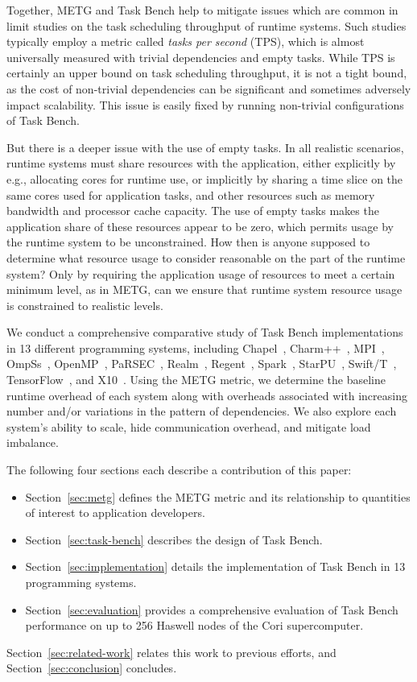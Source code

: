 Together, METG and Task Bench help to mitigate issues which are common
in limit studies on the task scheduling throughput of runtime
systems. Such studies typically employ a metric called \emph{tasks per
  second} (TPS), which is almost universally measured with trivial
dependencies and empty tasks. While TPS is certainly an upper bound on
task scheduling throughput, it is not a tight bound, as the cost of
non-trivial dependencies can be significant and sometimes adversely
impact scalability. This issue is easily fixed by running non-trivial
configurations of Task Bench.

But there is a deeper issue with the use of empty tasks. In all
realistic scenarios, runtime systems must share resources with the
application, either explicitly by e.g., allocating cores for runtime
use, or implicitly by sharing a time slice on the same cores used for
application tasks, and other resources such as memory bandwidth and
processor cache capacity. The use of empty tasks makes the application
share of these resources appear to be zero, which permits usage by the
runtime system to be unconstrained. How then is anyone supposed to
determine what resource usage to consider reasonable on the part of
the runtime system? Only by requiring the application usage of
resources to meet a certain minimum level, as in METG, can we ensure
that runtime system resource usage is constrained to realistic levels.

We conduct a comprehensive comparative study of Task Bench
implementations in 13 different programming systems, including
Chapel~\cite{Chapel07}, Charm++~\cite{Charmpp93}, MPI~\cite{MPI},
OmpSs~\cite{OmpSs11}, OpenMP~\cite{OpenMPSpec40},
PaRSEC~\cite{PARSEC13}, Realm~\cite{Realm14}, Regent~\cite{Regent15},
Spark~\cite{Spark10}, StarPU~\cite{StarPU11},
Swift/T~\cite{Wozniak13}, TensorFlow~\cite{TensorFlow15}, and
X10~\cite{X1005}. Using the METG metric, we determine the baseline
runtime overhead of each system along with overheads associated with
increasing number and/or variations in the pattern of dependencies. We
also explore each system's ability to scale, hide communication
overhead, and mitigate load imbalance.

The following four sections each describe a contribution of this
paper:

\begin{itemize}
\item Section~\ref{sec:metg} defines the METG metric and its
  relationship to quantities of interest to application developers.
\item Section~\ref{sec:task-bench} describes the design of Task Bench.
\item Section~\ref{sec:implementation} details the implementation of
  Task Bench in 13 programming systems.
\item Section~\ref{sec:evaluation} provides a comprehensive evaluation
  of Task Bench performance on up to 256 Haswell nodes of the Cori
  supercomputer.
\end{itemize}

Section~\ref{sec:related-work} relates this work to previous efforts,
and Section~\ref{sec:conclusion} concludes.
